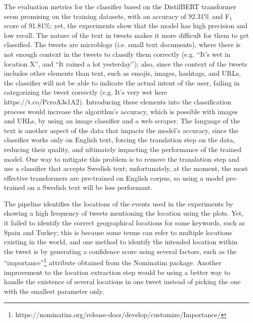 The evaluation metrics for the classifier based on the DistilBERT transformer seem promising on the
training datasets, with an accuracy of 92.31\% and F$_{1}$ score of 91.81\%; yet, the experiments
show that the model has high precision and low recall. The nature of the text in tweets makes it
more difficult for them to get classified. The tweets are microblogs (i.e. small text documents),
where there is not enough context in the tweets to classify them correctly (e.g. ``It's wet in
location X'', and ``It rained a lot yesterday''); also, since the context of the tweets includes
other elements than text, such as emojis, images, hashtags, and \ac{URL}s, the classifier will not
be able to indicate the actual intent of the user, failing in categorizing the tweet correctly (e.g.
It's very wet here https://t.co/PcroA3s1A2). Introducing these elements into the classification
process would increase the algorithm's accuracy, which is possible with images and \ac{URL}s, by
using an image classifier and a web scraper. The language of the text is another aspect of the data
that impacts the model's accuracy, since the classifier works only on English text, forcing the
translation step on the data, reducing their quality, and ultimately impacting the performance of
the trained model. One way to mitigate this problem is to remove the translation step and use a
classifier that accepts Swedish text; unfortunately, at the moment, the most effective transformers
are pre-trained on English corpus, so using a model pre-trained on a Swedish text will be less
performant.

The pipeline identifies the locations of the events used in the experiments by showing a high
frequency of tweets mentioning the location using the plots. Yet, it failed to identify the correct
geographical locations for some keywords, such as Spain and Turkey; this is because some terms can
refer to multiple locations existing in the world, and one method to identify the intended location
within the tweet is by generating a confidence score using several factors, such as the
``importance''\footnote{https://nominatim.org/release-docs/develop/customize/Importance/} attribute
obtained from the Nominatim package. Another improvement to the location extraction step would be
using a better way to handle the existence of several locations in one tweet instead of picking the
one with the smallest parameter only.

